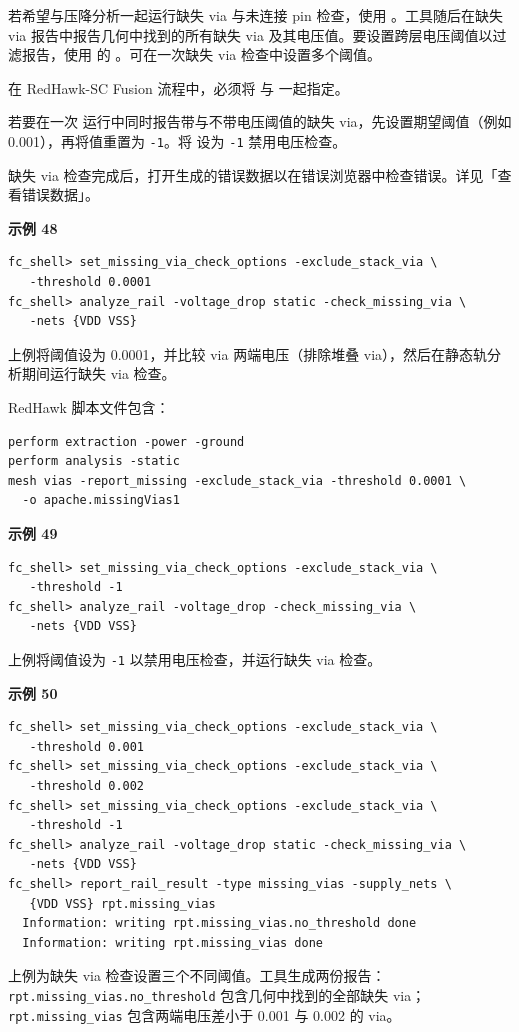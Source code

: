 若希望与压降分析一起运行缺失 via 与未连接 pin 检查，使用 。工具随后在缺失 via 报告中报告几何中找到的所有缺失 via 及其电压值。要设置跨层电压阈值以过滤报告，使用  的 。可在一次缺失 via 检查中设置多个阈值。

\begin{noteBox}
在 RedHawk-SC Fusion 流程中，必须将  与  一起指定。
\end{noteBox}

若要在一次  运行中同时报告带与不带电压阈值的缺失 via，先设置期望阈值（例如 0.001），再将值重置为 \texttt{-1}。将  设为 \texttt{-1} 禁用电压检查。

缺失 via 检查完成后，打开生成的错误数据以在错误浏览器中检查错误。详见「查看错误数据」。

\textbf{示例 48}
\begin{lstlisting}
fc_shell> set_missing_via_check_options -exclude_stack_via \
   -threshold 0.0001
fc_shell> analyze_rail -voltage_drop static -check_missing_via \
   -nets {VDD VSS}
\end{lstlisting}
上例将阈值设为 0.0001，并比较 via 两端电压（排除堆叠 via），然后在静态轨分析期间运行缺失 via 检查。

RedHawk 脚本文件包含：
\begin{lstlisting}
perform extraction -power -ground
perform analysis -static
mesh vias -report_missing -exclude_stack_via -threshold 0.0001 \
  -o apache.missingVias1
\end{lstlisting}

\textbf{示例 49}
\begin{lstlisting}
fc_shell> set_missing_via_check_options -exclude_stack_via \
   -threshold -1
fc_shell> analyze_rail -voltage_drop -check_missing_via \
   -nets {VDD VSS}
\end{lstlisting}
上例将阈值设为 \texttt{-1} 以禁用电压检查，并运行缺失 via 检查。

\textbf{示例 50}
\begin{lstlisting}
fc_shell> set_missing_via_check_options -exclude_stack_via \
   -threshold 0.001
fc_shell> set_missing_via_check_options -exclude_stack_via \
   -threshold 0.002
fc_shell> set_missing_via_check_options -exclude_stack_via \
   -threshold -1
fc_shell> analyze_rail -voltage_drop static -check_missing_via \
   -nets {VDD VSS}
fc_shell> report_rail_result -type missing_vias -supply_nets \
   {VDD VSS} rpt.missing_vias
  Information: writing rpt.missing_vias.no_threshold done
  Information: writing rpt.missing_vias done
\end{lstlisting}
上例为缺失 via 检查设置三个不同阈值。工具生成两份报告：\texttt{rpt.missing\_vias.no\_threshold} 包含几何中找到的全部缺失 via；\texttt{rpt.missing\_vias} 包含两端电压差小于 0.001 与 0.002 的 via。

